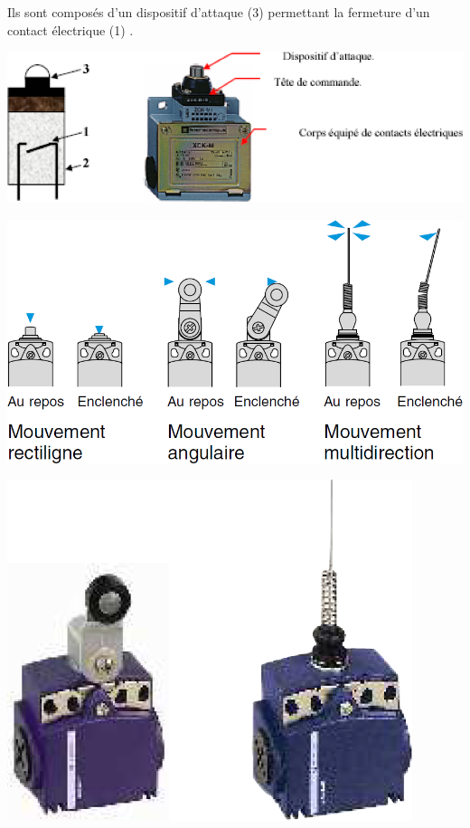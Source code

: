 \documentclass[10pt]{article}
\begin{document}
\begin{minipage}[c]{.45\linewidth}
Ils sont composés d'un dispositif d'attaque (3) permettant la fermeture d'un contact électrique (1) \cite{banna}.
\end{minipage}\hfill
\begin{minipage}[c]{.5\linewidth}
\begin{center}
    \includegraphics[width=.95\textwidth]{images/interrupteur_position_3}
\end{center}
\end{minipage}



\begin{minipage}[c]{.6\linewidth}
\begin{center}
    \includegraphics[width=.9\textwidth]{images/interrupteur_position}
\end{center}
\end{minipage}\hfill
\begin{minipage}[c]{.25\linewidth}
\begin{center}
    \includegraphics[width=.9\textwidth]{images/interrupteur_position_2}
\end{center}
\end{minipage}
\end{document}
